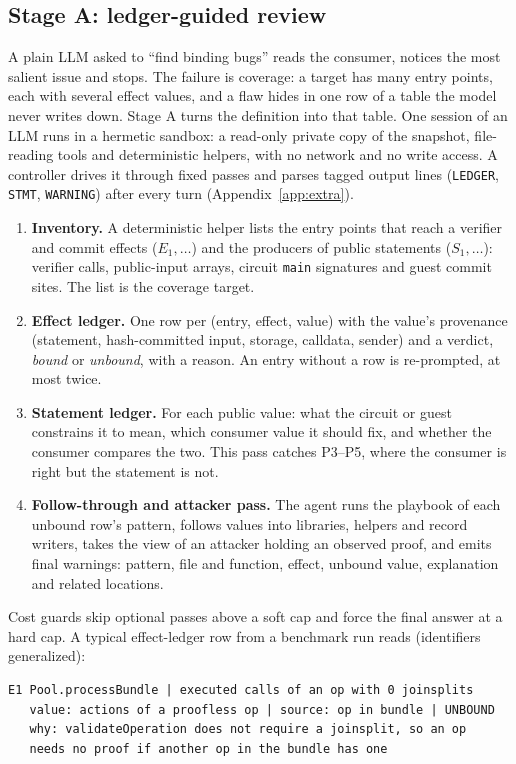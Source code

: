 \subsection{Stage A: ledger-guided review}\label{sec:design-stagea}

A plain LLM asked to ``find binding bugs'' reads the consumer, notices the
most salient issue and stops. The failure is coverage: a target has many
entry points, each with several effect values, and a flaw hides in one row
of a table the model never writes down. Stage A turns the definition into
that table. One session of an LLM runs in a hermetic sandbox: a read-only
private copy of the snapshot, file-reading tools and deterministic helpers,
with no network and no write access. A controller drives it through fixed
passes and parses tagged output lines (\texttt{LEDGER}, \texttt{STMT},
\texttt{WARNING}) after every turn (Appendix~\ref{app:extra}).
\begin{enumerate}
\item \textbf{Inventory.} A deterministic helper lists the entry points that
reach a verifier and commit effects ($E_1,\dots$) and the producers of public
statements ($S_1,\dots$): verifier calls, public-input arrays, circuit
\texttt{main} signatures and guest commit sites. The list is the coverage
target.
\item \textbf{Effect ledger.} One row per (entry, effect, value) with the
value's provenance (statement, hash-committed input, storage, calldata,
sender) and a verdict, \emph{bound} or \emph{unbound}, with a reason. An
entry without a row is re-prompted, at most twice.
\item \textbf{Statement ledger.} For each public value: what the circuit or
guest constrains it to mean, which consumer value it should fix, and whether
the consumer compares the two. This pass catches P3--P5, where the consumer
is right but the statement is not.
\item \textbf{Follow-through and attacker pass.} The agent runs the playbook
of each unbound row's pattern, follows values into libraries, helpers and
record writers, takes the view of an attacker holding an observed proof, and
emits final warnings: pattern, file and function, effect, unbound value,
explanation and related locations.
\end{enumerate}
Cost guards skip optional passes above a soft cap and force the final answer
at a hard cap. A typical effect-ledger row from a benchmark run reads
(identifiers generalized):
\begin{lstlisting}
E1 Pool.processBundle | executed calls of an op with 0 joinsplits
   value: actions of a proofless op | source: op in bundle | UNBOUND
   why: validateOperation does not require a joinsplit, so an op
   needs no proof if another op in the bundle has one
\end{lstlisting}

